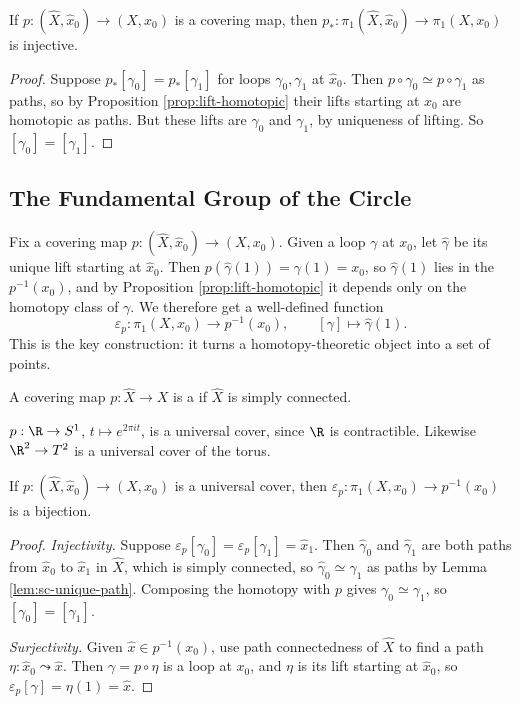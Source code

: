 \begin{corollary} \label{cor:p-injective}
	If $p: (\hat X, \hat x_0) \to (X, x_0)$ is a covering map, then $p_*: \pi_1(\hat{X}, \hat{x}_0) \rightarrow \pi_1(X, x_0)$ is injective.
\end{corollary}
\begin{proof}
	Suppose $p_*[\gamma_0] = p_*[\gamma_1]$ for loops $\gamma_0, \gamma_1$ at $\hat x_0$. Then $p \circ \gamma_0 \simeq p \circ \gamma_1$ as paths, so by Proposition \ref{prop:lift-homotopic} their lifts starting at $\hat x_0$ are homotopic as paths. But these lifts are $\gamma_0$ and $\gamma_1$, by uniqueness of lifting. So $[\gamma_0] = [\gamma_1]$.
\end{proof}

\subsection{The Fundamental Group of the Circle}

Fix a covering map $p: (\hat X, \hat x_0) \to (X, x_0)$. Given a loop $\gamma$ at $x_0$,
let $\hat\gamma$ be its unique lift starting at $\hat x_0$. Then
$p(\hat\gamma(1)) = \gamma(1) = x_0$, so $\hat\gamma(1)$ lies in the 
$p^{-1}(x_0)$, and by Proposition \ref{prop:lift-homotopic} it depends only on the
homotopy class of $\gamma$. We therefore get a well-defined function
$$
\varepsilon_p: \pi_1(X, x_0) \longrightarrow p^{-1}(x_0), \qquad [\gamma] \mapsto \hat\gamma(1).
$$
This is the key construction: it turns a homotopy-theoretic object into a set of points.

\begin{definition}
	A covering map $p: \hat{X} \to X$ is a  if $\hat X$ is simply connected.
\end{definition}

\begin{example}
	$p: \R \to S^1$, $t \mapsto e^{2\pi i t}$, is a universal cover, since $\R$ is contractible. Likewise $\R^2 \to T^2$ is a universal cover of the torus.
\end{example}

\begin{proposition} \label{prop:eps-bijection}
	If $p: (\hat X, \hat x_0) \to (X, x_0)$ is a universal cover, then $\varepsilon_p: \pi_1(X, x_0) \to p^{-1}(x_0)$ is a bijection.
\end{proposition}
\begin{proof}
	\emph{Injectivity.} Suppose $\varepsilon_p[\gamma_0] = \varepsilon_p[\gamma_1] = \hat x_1$. Then $\hat\gamma_0$ and $\hat\gamma_1$ are both paths from $\hat x_0$ to $\hat x_1$ in $\hat X$, which is simply connected, so $\hat\gamma_0 \simeq \hat\gamma_1$ as paths by Lemma \ref{lem:sc-unique-path}. Composing the homotopy with $p$ gives $\gamma_0 \simeq \gamma_1$, so $[\gamma_0] = [\gamma_1]$.

	\emph{Surjectivity.} Given $\hat x \in p^{-1}(x_0)$, use path connectedness of $\hat X$ to find a path $\eta: \hat x_0 \leadsto \hat x$. Then $\gamma = p \circ \eta$ is a loop at $x_0$, and $\eta$ is its lift starting at $\hat x_0$, so $\varepsilon_p[\gamma] = \eta(1) = \hat x$.
\end{proof}

